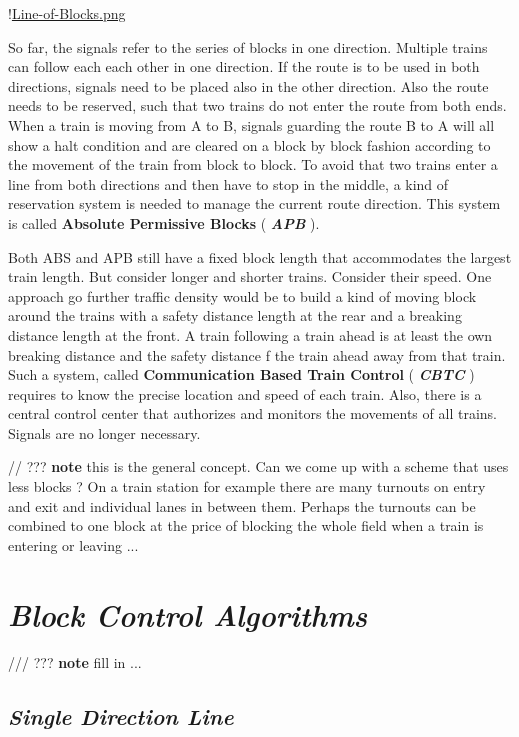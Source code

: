 !\href{./Figures/Line-of-Blocks.png }{Line-of-Blocks.png}

So far, the signals refer to the series of blocks in one direction. Multiple trains can follow each each other in one direction. If the route is to be used in both directions, signals need to be placed also in the other direction. Also the route needs to be reserved, such that two trains do not enter the route from both ends. When a train is moving from A to B, signals guarding the route B to A will all show a halt condition and are cleared on a block by block fashion according to the movement of the train from block to block. To avoid that two trains enter a line from both directions and then have to stop in the middle, a kind of reservation system is needed to manage the current route direction. This system is called \textbf{Absolute Permissive Blocks} ( \textbf{\textit{APB}} ).

Both ABS and APB still have a fixed block length that accommodates the largest train length. But consider longer and shorter trains. Consider their speed. One approach go further traffic density would be to build a kind of moving block around the trains with a safety distance length at the rear and a breaking distance length at the front. A train following a train ahead is at least the own breaking distance and the safety distance f the train ahead away from that train. Such a system, called \textbf{Communication Based Train Control} ( \textbf{\textit{CBTC}} ) requires to know the precise location and speed of each train. Also, there is a central control center that authorizes and monitors the movements of all trains. Signals are no longer necessary.

// ??? \textbf{note} this is the general concept. Can we come up with a scheme that uses less blocks ? On a train station for example there are many turnouts on entry and exit and individual lanes in between them. Perhaps the turnouts can be combined to one block at the price of blocking the whole field when a train is entering or leaving ...

\section{\textit{Block Control Algorithms}}

/// ??? \textbf{note} fill in ...

\subsection{\textit{Single Direction Line}}

